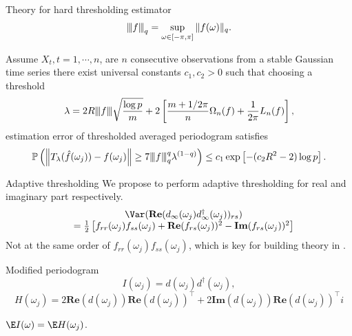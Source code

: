 \documentclass[handout,xcolor={usenames,dvipsnames}]{beamer}
\begin{document}
\begin{frame}{Theory for hard thresholding estimator}
\[
{\left\vert\kern-0.25ex\left\vert\kern-0.25ex\left\vert f \right\vert\kern-0.25ex\right\vert\kern-0.25ex\right\vert}_q = \sup_{\omega \in [-\pi, \pi]}\|f(\omega)\|_q. \nonumber
\]
\begin{thm}
	Assume ${X}_t, t=1,\cdots,n$, are $n$ consecutive observations from a stable Gaussian time series 
	there exist universal constants $c_1, c_2 > 0$ such that choosing a threshold 
		\begin{equation}
	\label{eq:threshold_value}
	\lambda = 2R {\left\vert\kern-0.25ex\left\vert\kern-0.25ex\left\vert f \right\vert\kern-0.25ex\right\vert\kern-0.25ex\right\vert}\sqrt{\frac{\log p}{m}} +2\left[ \frac{m+1/2\pi}{n}\Omega_n(f)+\frac{1}{2\pi}L_n(f)\right], 
	\end{equation}
	estimation error of thresholded averaged periodogram satisfies 
	\begin{equation}
	\begin{aligned}
	\mathbb{P}\left(\left\|T_{\lambda}(\hat{f}(\omega_j)) - f(\omega_j)\right\|\ge 7{\left\vert\kern-0.25ex\left\vert\kern-0.25ex\left\vert f \right\vert\kern-0.25ex\right\vert\kern-0.25ex\right\vert}_q^q \lambda^{(1-q)} \right)
	\le c_1 \exp\left[-(c_2 R^2-2)\log p\right]. \nonumber
	\end{aligned}
	\end{equation}
\end{thm}
\end{frame}


\begin{frame}{Adaptive thresholding}
We propose to perform adaptive thresholding for real and imaginary part respectively.  
\begin{equation}
\label{eq:variance_of_real_periodogram}
\begin{array}{cc}
&\Var(\mathbf{Re}(d_{\infty}(\omega_j)d^\dag_{\infty}(\omega_j))_{rs})      \\
& = \frac{1}{2}\left[f_{rr}(\omega_j)f_{ss}(\omega_j)+\mathbf{Re}(f_{rs}(\omega_j))^2-\mathbf{Im}(f_{rs}(\omega_j))^2\right]
\end{array}
\end{equation}
Not at the same order of $f_{rr}(\omega_j)f_{ss}(\omega_j)$, which is key for building theory in . 
\end{frame}


\begin{frame}{Modified periodogram}
\[
I(\omega_j) = d(\omega_j) d^\dag(\omega_j), 
\]
\[
H(\omega_j) = 2\mathbf{Re}(d(\omega_j))  \mathbf{Re}(d(\omega_j))^\top+2\mathbf{Im}(d(\omega_j))  \mathbf{Re}(d(\omega_j))^\top i
\]
\begin{center}
  $\E I(\omega) = \E H(\omega_j)$. 
\end{center}
\end{frame}
\end{document}
